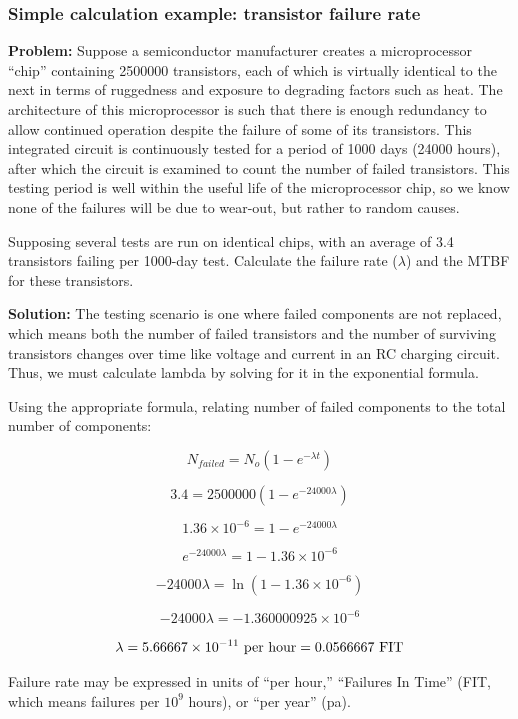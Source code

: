 \filbreak
\subsubsection{Simple calculation example: transistor failure rate}

\noindent
\textbf{Problem:} Suppose a semiconductor manufacturer creates a microprocessor ``chip'' containing 2500000 transistors, each of which is virtually identical to the next in terms of ruggedness and exposure to degrading factors such as heat.  The architecture of this microprocessor is such that there is enough redundancy to allow continued operation despite the failure of some of its transistors.  This integrated circuit is continuously tested for a period of 1000 days (24000 hours), after which the circuit is examined to count the number of failed transistors.  This testing period is well within the useful life of the microprocessor chip, so we know none of the failures will be due to wear-out, but rather to random causes.

Supposing several tests are run on identical chips, with an average of 3.4 transistors failing per 1000-day test.  Calculate the failure rate ($\lambda$) and the MTBF for these transistors.

\vskip 10pt

\noindent
\textbf{Solution:} The testing scenario is one where failed components are not replaced, which means both the number of failed transistors and the number of surviving transistors changes over time like voltage and current in an RC charging circuit.  Thus, we must calculate lambda by solving for it in the exponential formula.

Using the appropriate formula, relating number of failed components to the total number of components:

$$N_{failed} = N_o \left(1 - e^{-\lambda t}\right)$$

$$3.4 = 2500000 \left(1 - e^{-24000 \lambda}\right)$$

$$1.36 \times 10^{-6} = 1 - e^{-24000 \lambda}$$

$$e^{-24000 \lambda} = 1 - 1.36 \times 10^{-6}$$

$$-24000 \lambda = \ln (1 - 1.36 \times 10^{-6})$$

$$-24000 \lambda = -1.360000925 \times 10^{-6}$$

$$\lambda = 5.66667 \times 10^{-11} \hbox{ per hour} = 0.0566667 \hbox{ FIT}$$

Failure rate may be expressed in units of ``per hour,'' ``Failures In Time'' (FIT, which means failures per $10^{9}$ hours), or ``per year'' (pa).

